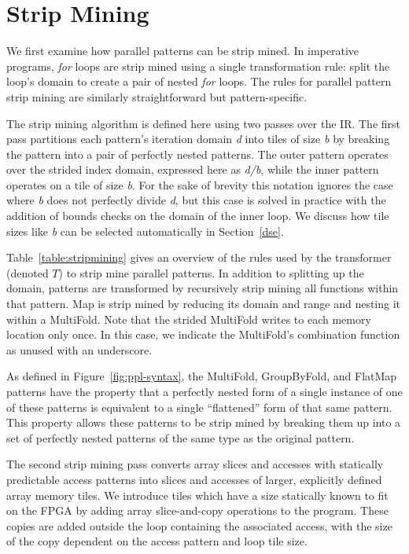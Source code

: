 

\section{Strip Mining}
\label{sec:strip-mining}
We first examine how parallel patterns can be strip mined.
In imperative programs, \emph{for} loops are strip mined using a single transformation
rule: split the loop's domain to create a pair of nested \emph{for} loops.
The rules for parallel pattern strip mining are similarly straightforward
but pattern-specific.

The strip mining algorithm is defined here using two passes over the IR.
The first pass partitions each pattern's iteration domain \emph{d} into tiles of
size \emph{b} by breaking the pattern into a pair of perfectly nested patterns.
The outer pattern operates over the strided index domain, expressed here as
\emph{d/b}, while the inner pattern operates on a tile of size \emph{b}.
For the sake of brevity this notation ignores the case where \emph{b} does not
perfectly divide \emph{d}, but this case is solved in practice with the
addition of bounds checks on the domain of the inner loop.
We discuss how tile sizes like \emph{b}
can be selected automatically in Section~\ref{dse}.

Table~\ref{table:stripmining} gives an overview of the rules used by the transformer
(denoted $T$) to strip mine parallel patterns.
In addition to splitting up the domain, patterns are transformed by recursively
strip mining all functions within that pattern.
Map is strip mined by reducing its domain and range and nesting it within a MultiFold.
Note that the strided MultiFold writes to each memory location only once.
In this case, we indicate the MultiFold's combination function as unused with an underscore.

As defined in Figure~\ref{fig:ppl-syntax}, the MultiFold, GroupByFold, and FlatMap patterns have the property that a perfectly nested form of a single instance of one of these
patterns is equivalent to a single ``flattened'' form of that same pattern. This property allows these patterns to be strip mined by
breaking them up into a set of perfectly nested patterns of the same type as the original pattern.

The second strip mining pass converts array slices and accesses with statically predictable access patterns into slices and accesses of larger, explicitly defined
array memory tiles. We introduce tiles which have a size statically known to fit on the FPGA by adding array slice-and-copy operations to the program. These copies are added
outside the loop containing the associated access, with the size of the copy
dependent on the access pattern and loop tile size.

